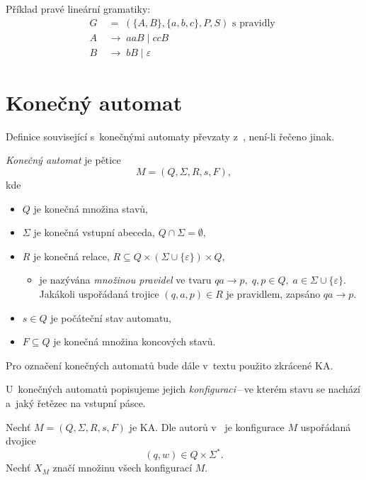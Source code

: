 \begin{example}
    Příklad pravé lineární gramatiky:
    \begin{align*}
        G \; &= \; (\{A, B\}, \{a, b, c\}, P, S) \text{ s~pravidly } \\
        A \; &\rightarrow \; aaB \; | \; ccB \\
        B \; &\rightarrow \; bB \; | \; \varepsilon
    \end{align*}
\end{example}

\section{Konečný automat}
Definice související s~konečnými automaty převzaty z~\cite{meduna2023automata}, není-li řečeno jinak.
\begin{definition}\label{def_konecny_automat}
    \emph{Konečný automat} je pětice
    \begin{equation*}
        M = (Q, \Sigma, R, s, F),
    \end{equation*}
    kde
    \begin{itemize}
        \item $Q$ je konečná množina stavů,
        \item $\Sigma$ je konečná vstupní abeceda, $Q \cap \Sigma = \emptyset$,
        \item $R$ je konečná relace, $R \subseteq Q \times (\Sigma \cup \{\varepsilon\}) \times Q$,
        \begin{itemize}[label=$\circ$]
            \item je nazývána \emph{množinou pravidel} ve tvaru $qa \rightarrow p,\; q, p \in Q,\;a \in \Sigma \cup \{\varepsilon\}$.
            Jakákoli uspořádaná trojice $(q, a, p) \in R$ je pravidlem, zapsáno $qa \rightarrow p$.
        \end{itemize}
        \item $s \in Q$ je počáteční stav automatu,
        \item $F \subseteq Q$ je konečná množina koncových stavů. 
    \end{itemize}
\end{definition}

\begin{convention}
    Pro označení konečných automatů bude dále v~textu použito zkrácené KA. 
\end{convention}

U~konečných automatů popisujeme jejich \emph{konfiguraci}\,--\,ve kterém stavu se nachází a~jaký řetězec na vstupní pásce.
\begin{definition}\label{def_konfigurace_ka}
    Nechť $M = (Q, \Sigma, R, s, F)$ je KA. Dle autorů v~\cite{TIN-opora} je konfigurace $M$ uspořádaná dvojice
    \begin{equation*}
        (q, w) \in Q \times \Sigma^*.
    \end{equation*} 
    Nechť $X_M$ značí množinu všech konfigurací $M$.
\end{definition}

